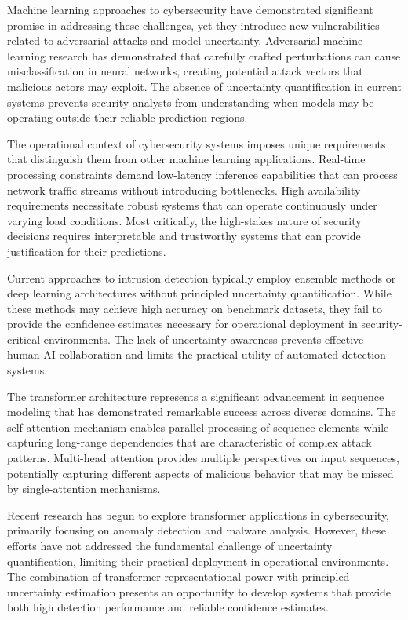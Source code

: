 \documentclass[journal]{IEEEtran}
\begin{document}
Machine learning approaches to cybersecurity have demonstrated significant promise in addressing these challenges, yet they introduce new vulnerabilities related to adversarial attacks and model uncertainty. Adversarial machine learning research has demonstrated that carefully crafted perturbations can cause misclassification in neural networks, creating potential attack vectors that malicious actors may exploit. The absence of uncertainty quantification in current systems prevents security analysts from understanding when models may be operating outside their reliable prediction regions.

The operational context of cybersecurity systems imposes unique requirements that distinguish them from other machine learning applications. Real-time processing constraints demand low-latency inference capabilities that can process network traffic streams without introducing bottlenecks. High availability requirements necessitate robust systems that can operate continuously under varying load conditions. Most critically, the high-stakes nature of security decisions requires interpretable and trustworthy systems that can provide justification for their predictions.

Current approaches to intrusion detection typically employ ensemble methods or deep learning architectures without principled uncertainty quantification. While these methods may achieve high accuracy on benchmark datasets, they fail to provide the confidence estimates necessary for operational deployment in security-critical environments. The lack of uncertainty awareness prevents effective human-AI collaboration and limits the practical utility of automated detection systems.

The transformer architecture represents a significant advancement in sequence modeling that has demonstrated remarkable success across diverse domains. The self-attention mechanism enables parallel processing of sequence elements while capturing long-range dependencies that are characteristic of complex attack patterns. Multi-head attention provides multiple perspectives on input sequences, potentially capturing different aspects of malicious behavior that may be missed by single-attention mechanisms.

Recent research has begun to explore transformer applications in cybersecurity, primarily focusing on anomaly detection and malware analysis. However, these efforts have not addressed the fundamental challenge of uncertainty quantification, limiting their practical deployment in operational environments. The combination of transformer representational power with principled uncertainty estimation presents an opportunity to develop systems that provide both high detection performance and reliable confidence estimates.
\end{document}
